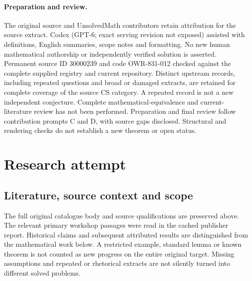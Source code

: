 \documentclass[11pt]{article}
\begin{document}
\paragraph{Preparation and review.}
The original source and UnsolvedMath contributors retain attribution for the source extract. Codex (GPT-6; exact serving revision not exposed) assisted with definitions, English summaries, scope notes and formatting. No new human mathematical authorship or independently verified solution is asserted. Permanent source ID 30000239 and code OWR-831-012 checked against the complete supplied registry and current repository. Distinct upstream records, including repeated questions and broad or damaged extracts, are retained for complete coverage of the source CS category. A repeated record is not a new independent conjecture. Complete mathematical-equivalence and current-literature review has not been performed. Preparation and final review follow contribution prompts C and D, with source gaps disclosed. Structural and rendering checks do not establish a new theorem or open status.
\label{end:30000239}

\section{Research attempt}
\subsection{Literature, source context and scope}
The full original catalogue body and source qualifications are preserved above. The relevant primary workshop passages were read in the cached publisher report. Historical claims and subsequent attributed results are distinguished from the mathematical work below. A restricted example, standard lemma or known theorem is not counted as new progress on the entire original target. Missing assumptions and repeated or rhetorical extracts are not silently turned into different solved problems.
\end{document}
